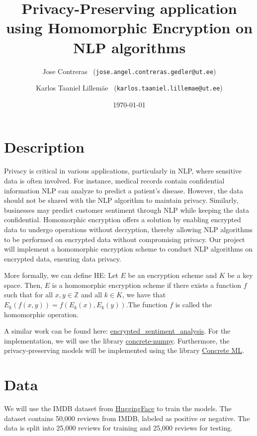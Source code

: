 \documentclass{article}
\title{Privacy-Preserving application using Homomorphic Encryption on NLP algorithms}
\author{Jose Contreras \ (\texttt{jose.angel.contreras.gedler@ut.ee}) \\
  \and Karlos Taaniel Lillemäe  \ (\texttt{karlos.taaniel.lillemae@ut.ee}) }
\date{\today}
\begin{document}
\maketitle


\section*{Description}

Privacy is critical in various applications, particularly in NLP, where sensitive data is often involved. For instance, medical records contain confidential information NLP can analyze to predict a patient's disease. However, the data should not be shared with the NLP algorithm to maintain privacy. Similarly, businesses may predict customer sentiment through NLP while keeping the data confidential. Homomorphic encryption offers a solution by enabling encrypted data to undergo operations without decryption, thereby allowing NLP algorithms to be performed on encrypted data without compromising privacy. Our project will implement a homomorphic encryption scheme to conduct NLP algorithms on encrypted data, ensuring data privacy.

More formally, we can define HE: Let $E$ be an encryption scheme and $K$ be a key space. Then, $E$ is a homomorphic encryption scheme if there exists a function $f$ such that for all $x,y \in \mathbb{Z}$ and all $k \in K$, we have that $E_k(f(x,y)) = f(E_k(x), E_k(y))$.The function $f$ is called the homomorphic operation.

A similar work can be found here: \href{https://huggingface.co/spaces/zama-fhe/encrypted\_sentiment\_analysis}{encrypted\_sentiment\_analysis}. For the implementation, we will use the library \href{https://docs.zama.ai/concrete-numpy/}{concrete-numpy}\cite{ConcreteNumpy}. Furthermore, the privacy-preserving models will be implemented using the library \href{https://github.com/zama-ai/concrete-ml}{Concrete ML}\cite{ConcreteML}.

\section*{Data}

We will use the IMDB dataset from \href{https://huggingface.co/datasets/imdb}{HuggingFace}\cite{maas-EtAl:2011:ACL-HLT2011} to train the models. The dataset contains 50,000 reviews from IMDB, labeled as positive or negative. The data is split into 25,000 reviews for training and 25,000 reviews for testing.
\end{document}

